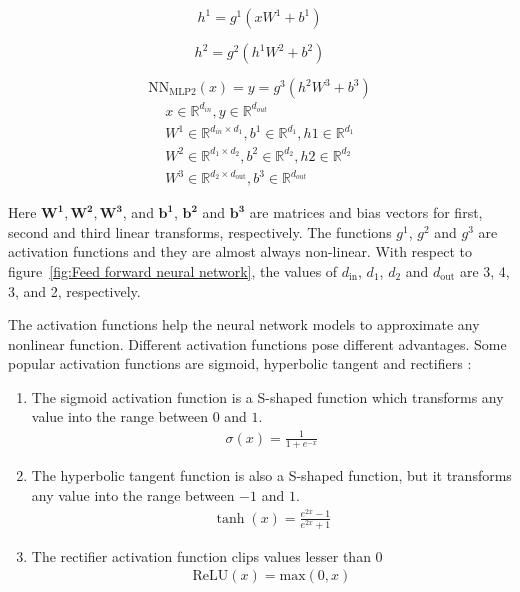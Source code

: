 \documentclass[a4paper, 11pt]{article}
\begin{document}
\begin{equation} \label{equ: feed forward hidden layer}
h^1 = g^1(xW^1 + b^1)
\end{equation}

\begin{equation}
h^2 = g^2(h^1W^2 + b^2)
\end{equation}

\begin{equation} \label{equ: feed forward output layer}
\mathrm{NN_{MLP2}}(x) = y = g^3(h^2W^3 + b^3)
\end{equation}
\begin{align*}
x \in \mathbb{R}^{d_{in}}, y \in \mathbb{R}^{d_{out}} \\
W^1 \in \mathbb{R}^{d_{in} \times d_1}, b^1 \in \mathbb{R}^{d_1}, h1 \in \mathbb{R}^{d_{1}} \\
W^2 \in \mathbb{R}^{d_1 \times d_2}, b^2 \in \mathbb{R}^{d_2}, h2 \in \mathbb{R}^{d_{2}}\\
W^3 \in \mathbb{R}^{d_2 \times d_\mathrm{out}}, b^3 \in \mathbb{R}^{d_{out}}
\end{align*}

Here $\mathbf{W^1, W^2, W^3}$,  and $\mathbf{b^1}$, $\mathbf{b^2}$ and $\mathbf{b^3}$ are matrices and bias vectors for first, second and third linear transforms, respectively. The functions $g^1$, $g^2$ and $g^3$ are activation functions and they are almost always non-linear. With respect to figure~\ref{fig:Feed forward neural network}, the values of $d_\mathrm{in}$, $d_{1}$, $d_{2}$ and $d_\mathrm{out}$ are 3, 4, 3, and 2, respectively. 

The activation functions help the neural network models to approximate any nonlinear function. Different activation functions pose different advantages. Some popular activation functions are sigmoid, hyperbolic tangent and rectifiers \parencite{Goldberg2016}:

\begin{enumerate}

\item The sigmoid activation function is a S-shaped function which transforms any value into the range between $0$ and $1$.  
\begin{align*}
\sigma (x) = \frac{1}{1 + e^{-x}}
\end{align*}

\item The hyperbolic tangent function is also a S-shaped function, but it transforms any value into the range between $-1$ and $1$.
\begin{align*}
\tanh (x) = \frac{e^{2x}-1}{e^{2x}+1}
\end{align*}

\item The rectifier activation function clips values lesser than $0$
\begin{align*}
\mathrm{ReLU}(x) = \mathrm{max}(0,x)
\end{align*}

\end{enumerate}
\end{document}
